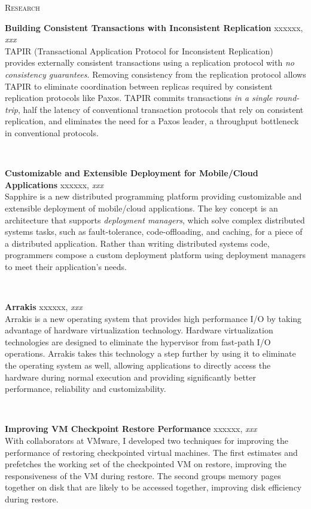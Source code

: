\documentclass[10pt,times]{report}
\newlength{\sectiongap}
\newlength{\entrygap}
\newlength{\sectioncolwidth}
\newlength{\colgap}
\newlength{\stuffwidth}
\def\ifEqString#1#2{\def\testa{#1}\def\testb{#2}%
  \ifx\testa\testb}
\newenvironment{rtable}{
  \begin{minipage}{\textwidth}
  }{
  \end{minipage}
}
\newenvironment{rentry}[3][xxx]{
  \begin{minipage}[t]{\hsize}
    \textbf{#2}\ifEqString{#1}{xxx}\relax\else, \textit{#1}\fi
    \hspace{\stretch{1}} #3 \\
  }{
    \removelastskip
  \end{minipage}
  \\[\entrygap]  %
}
\newenvironment{rsection}[1]{
  \begin{minipage}[t]{\sectioncolwidth}
    \textsc{#1}
  \end{minipage}
  \hspace{\colgap}
  \begin{minipage}[t]{\stuffwidth}
  }{
    \removelastskip
  \end{minipage}
  \\[\sectiongap]
}
\begin{document}
\begin{rtable}
  \begin{rsection}{Research}
    \begin{rentry}{Building Consistent Transactions with Inconsistent
        Replication}{}
      TAPIR (Transactional Application Protocol for Inconsistent
      Replication) provides externally consistent transactions using a
      replication protocol with \emph{no consistency guarantees}.
      Removing consistency from the replication protocol allows TAPIR
      to eliminate coordination between replicas required by
      consistent replication protocols like Paxos. TAPIR commits
      transactions \emph{in a single round-trip}, half the latency of
      conventional transaction protocols that rely on consistent
      replication, and eliminates the need for a Paxos leader, a
      throughput bottleneck in conventional protocols.
    \end{rentry}

    \begin{rentry}{Customizable and Extensible Deployment for
        Mobile/Cloud Applications}{}
      Sapphire is a new distributed programming platform providing
      customizable and extensible deployment of mobile/cloud
      applications. The key concept is an architecture that supports
      \emph{deployment managers}, which solve complex distributed
      systems tasks, such as fault-tolerance, code-offloading, and
      caching, for a piece of a distributed application. Rather than
      writing distributed systems code, programmers compose a custom
      deployment platform using deployment managers to meet their
      application's needs.
    \end{rentry}

    \begin{rentry}{Arrakis}{}
      Arrakis is a new operating system that provides high performance
      I/O by taking advantage of hardware virtualization
      technology. Hardware virtualization technologies are designed to
      eliminate the hypervisor from fast-path I/O operations. Arrakis
      takes this technology a step further by using it to eliminate
      the operating system as well, allowing applications to directly
      access the hardware during normal execution and providing
      significantly better performance, reliability and
      customizability.
    \end{rentry}

    \begin{rentry}{Improving VM Checkpoint Restore Performance}{} 
      With collaborators at VMware, I developed two techniques for
      improving the performance of restoring checkpointed virtual
      machines. The first estimates and prefetches the working set of
      the checkpointed VM on restore, improving the responsiveness of
      the VM during restore. The second groups memory pages together
      on disk that are likely to be accessed together, improving disk
      efficiency during restore.
    \end{rentry}


\end{rsection}
\end{rtable}
\end{document}
